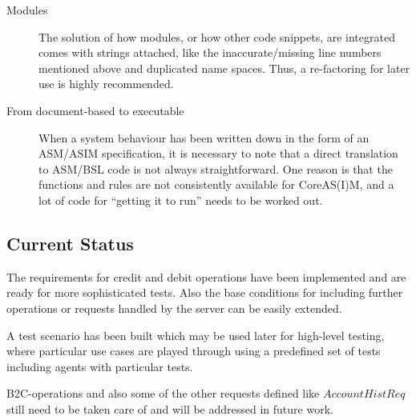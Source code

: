 \begin{description}
	\item[Modules] The solution of how modules, or how other code snippets, are integrated comes with strings attached, like the inaccurate/missing line numbers mentioned above and duplicated name spaces. Thus, a re-factoring for later use is highly recommended.
	\item[From document-based to executable] When a system behaviour has been written down in the form of an ASM/ASIM specification, it is necessary to note that a direct translation to ASM/BSL code is not always straightforward. One reason is that the functions and rules are not consistently available for CoreAS(I)M, and a lot of code for ``getting it to run'' needs to be worked out.
\end{description}

\subsection{Current Status}

The requirements for credit and debit operations have been implemented and are ready for more sophisticated tests. Also the base conditions for including further operations or requests handled by the server can be easily extended.

A test scenario has been built which may be used later for high-level testing, where particular use cases are played through using a predefined set of tests including agents with particular tests.

B2C-operations and also some of the other requests defined like $AccountHistReq$ still need to be taken care of and will be addressed in future work.









